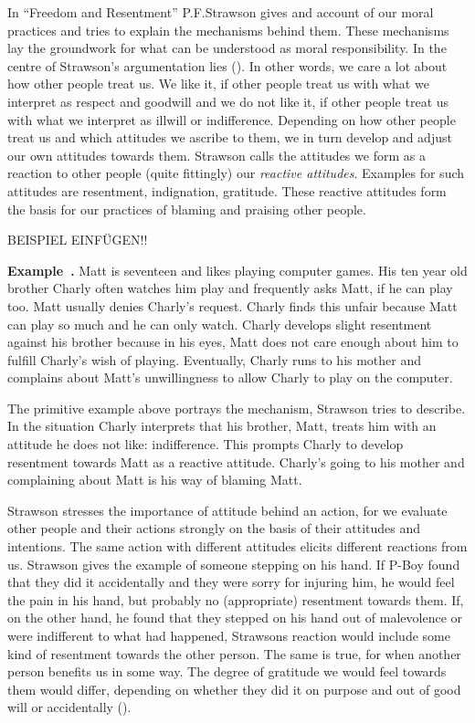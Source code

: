 \documentclass{article}
\newcounter{example}
\newenvironment{example}[1][]{\refstepcounter{example}\par\medskip
   \noindent \textbf{Example~\theexample. #1} \rmfamily}{\medskip}
\begin{document}
In ``Freedom and Resentment'' P.F.Strawson gives and account of our moral
practices and tries to explain the mechanisms behind them. These mechanisms lay
the groundwork for what can be understood as moral responsibility.
In the centre of Strawson's argumentation lies (\cite[p.5]{Strawson1962}). In other words, we care a lot about how other
people treat us. We like it, if other people treat us with what we interpret as
respect and goodwill and we do not like it, if other people treat us with what
we interpret as illwill or indifference. Depending on how other people treat us
and which attitudes we ascribe to them, we in turn develop and adjust our own
attitudes towards them. Strawson calls the attitudes we form as a reaction to
other people (quite fittingly) our \textit{reactive
attitudes}. Examples for such attitudes are resentment, indignation, gratitude.
These reactive attitudes form the basis for our practices of blaming and
praising other people.

BEISPIEL EINFÜGEN!!


\begin{example}
	Matt is seventeen and likes playing computer games. His ten year old brother
	Charly often watches him play and frequently asks Matt, if he can play
	too. Matt usually denies Charly's request. Charly finds this unfair
	because Matt can play so much and he can only watch. Charly develops
	slight resentment against his brother because in his eyes, Matt
	does not care enough about him to fulfill Charly's wish of playing.
	Eventually, Charly runs to his mother and complains about Matt's
	unwillingness to allow Charly to play on the computer.
\end{example}

The primitive example above portrays the mechanism, Strawson tries to describe.
In the situation Charly interprets that his brother, Matt, treats him with an
attitude he does not like: indifference. This prompts Charly to develop
resentment towards Matt as a reactive attitude. Charly's going to his mother and
complaining about Matt is his way of blaming Matt.

Strawson stresses the importance of attitude behind an action, for we evaluate
other people and their actions strongly on the basis of their attitudes and
intentions. The same action with different attitudes elicits different reactions
from us. Strawson gives the example of someone stepping on his hand. If P-Boy
found that they did it accidentally and they were sorry for injuring him, he
would feel the pain in his hand, but probably no (appropriate) resentment
towards them. If, on the other hand, he found that they stepped on his hand out
of malevolence or were indifferent to what had happened, Strawsons reaction
would include some kind of resentment towards the other person. The same is
true, for when another person benefits us in some way. The degree of gratitude
we would feel towards them would differ, depending on whether they did it on
purpose and out of good will or accidentally (\cite[p.6]{Strawson1962}).
\end{document}
